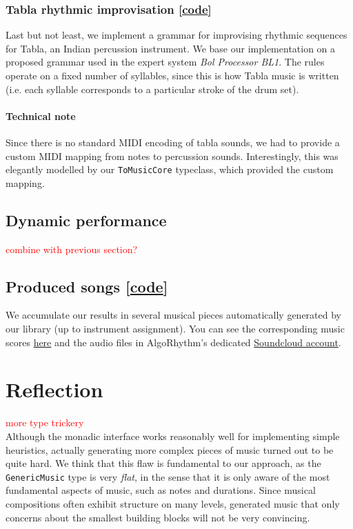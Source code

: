 \documentclass[11pt,a4paper]{article}
\newcommand{\icode}[1]{\texttt{#1}}
\newcommand\todo[1]{\textcolor{red}{#1}}
\begin{document}
\subsubsection{Tabla rhythmic improvisation [\href{https://github.com/omelkonian/AlgoRhythm/blob/master/AlgoRhythm/src/Grammar/Tabla.hs}{code}]}
Last but not least, we implement a grammar for improvising rhythmic sequences for Tabla, an Indian percussion instrument. We base our implementation on a proposed grammar used in the expert system \textit{Bol Processor BL1}\cite{tabla}. The rules operate on a fixed number of syllables, since this is how Tabla music is written (i.e. each syllable corresponds to a particular stroke of the drum set).\vspace{-3mm}
\paragraph{Technical note} Since there is no standard MIDI encoding of tabla sounds, we had to provide a custom MIDI mapping from notes to percussion sounds. Interestingly, this was elegantly modelled by our \icode{ToMusicCore} typeclass, which provided the custom mapping.

\subsection{Dynamic performance}
\todo{combine with previous section?}

\subsection{Produced songs [\href{https://github.com/omelkonian/AlgoRhythm/blob/master/AlgoRhythm/app/Main.hs}{code}]} We accumulate our results in several musical pieces automatically generated by our library (up to instrument assignment). You can see the corresponding music scores \href{https://github.com/omelkonian/AlgoRhythm/tree/master/output}{here} and the audio files in AlgoRhythm's dedicated \href{https://soundcloud.com/algo-rhythm-haskell/sets}{Soundcloud account}.

\section{Reflection}
\todo{more type trickery}\\
Although the monadic interface works reasonably well for implementing simple heuristics, actually generating more complex pieces of music turned out to be quite hard. We think that this flaw is fundamental to our approach, as the \icode{GenericMusic} type is very \emph{flat}, in the sense that it is only aware of the most fundamental aspects of music, such as notes and durations. Since musical compositions often exhibit structure on many levels, generated music that only concerns about the smallest building blocks will not be very convincing.
\end{document}

